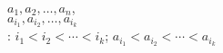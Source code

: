 \documentclass[preview]{standalone}
\begin{document}
\centering {} $a_1, a_2, \ldots , a_n$, \\  $a_{i_1}, a_{i_2}, \ldots , a_{i_k}$ \\ : $i_1 < i_2 < \cdots < i_k$; $a_{i_1} < a_{i_2} < \cdots < a_{i_k}$
\end{document}
